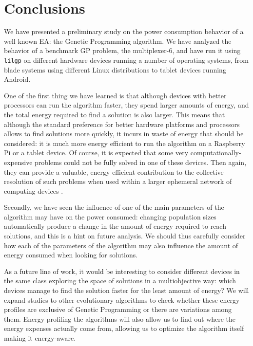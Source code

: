 \section{Conclusions}
\label{conclusions}

We have presented a preliminary study on the power consumption
behavior of a well known EA: the Genetic Programming algorithm.  We
have analyzed the behavior of a benchmark GP problem, the
multiplexer-6, and have run it using {\tt lilgp} on different
hardware devices running a number of operating systems, from blade
systems using different Linux distributions to tablet devices running
Android. 

One of the first thing we have learned is that although devices with
better processors can run the algorithm faster, they spend
larger amounts of energy, and the total energy required to find a
solution is also larger.  This means that although the standard
preference for better hardware platforms and processors allows to find
solutions more quickly, it incurs in waste of energy that should be
considered:  it is much more energy efficient to run the algorithm on
a Raspberry Pi or a tablet device. Of course, it is expected that some very 
computationally-expensive problems could not be fully solved in one
of these devices. Then again, they can provide a valuable, energy-efficient
contribution to the collective resolution of such problems when used
within a larger ephemeral network of computing devices \cite{self}.

Secondly, we have seen the influence of one of the main parameters
of the algorithm may have on the power consumed:  changing population
sizes automatically produce a change in the amount of energy required to reach
solutions, and this is a hint on future analysis.  We should thus carefully
consider how each of the parameters of the algorithm may also
influence the amount of energy consumed when looking for solutions. 

As a future line of work, it would be interesting to consider
different devices in the same class exploring the space of
solutions in a multiobjective way: which devices manage to find the
solution faster for the least amount of energy? We will expand studies
to other evolutionary algorithms to check whether these energy
profiles are exclusive of Genetic Programming or there are variations
among them. Energy profiling the algorithms will also allow us to find
out where the energy expenses actually come from, allowing us to
optimize the algorithm itself making it energy-aware.